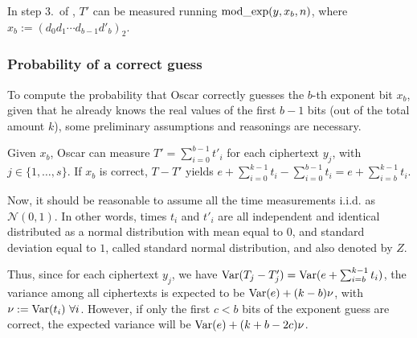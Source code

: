 
In step 3.\ of , $T'$ can be measured running $\operatorname{mod\_exp}(y, x_b, n)$, where $x_b := (d_0 d_1 \cdots d_{b-1} d'_b)_2$.

\subsubsection{Probability of a correct guess}\label{subsub:guess}

To compute the probability that Oscar correctly guesses the $b$-th exponent bit $x_b$, given that he already knows the real values of the first $b - 1$ bits (out of the total amount $k$), some preliminary assumptions and reasonings are necessary.

Given $x_b$, Oscar can measure $T' = \sum_{i = 0}^{b - 1} t'_i$ for each ciphertext $y_j$, with $j \in \{ 1, \dots, s \}$. If $x_b$ is correct, $T - T'$ yields $e + \sum_{i = 0}^{k - 1} t_i - \sum_{i = 0}^{b - 1} t_i = e + \sum_{i = b}^{k - 1} t_i$.

Now, it should be reasonable to assume all the time measurements i.i.d. as $\mathcal{N}(0, 1)$. In other words, times $t_i$ and $t'_i$ are all independent and identical distributed as a normal distribution with mean equal to $0$, and standard deviation equal to $1$, called standard normal distribution, and also denoted by $Z$.

Thus, since for each ciphertext $y_j$, we have $\operatorname{Var}(T_j - T'_j) = \operatorname{Var}(e + \sum_{i = b}^{k - 1} t_i)$, the variance among all ciphertexts is expected to be $\operatorname{Var}(e) + (k - b)\nu$, with $\nu := \operatorname{Var}(t_i)\ \forall i$. However, if only the first $c < b$ bits of the exponent guess are correct, the expected variance will be $\operatorname{Var}(e) + (k + b - 2c)\nu$.

